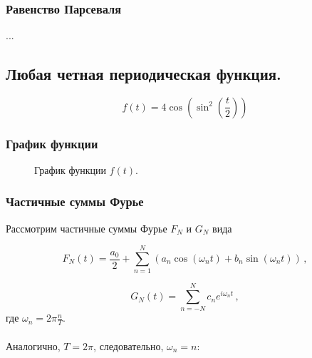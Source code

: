 \documentclass[a5paper, 10pt]{article}
\theoremstyle{definition}
\theoremstyle{plain}
\theoremstyle{remark}
\begin{document}
\newpage
\,
\newpage
\subsubsection{Равенство Парсеваля}

...







\newpage
\subsection{Любая четная периодическая функция.}
\begin{equation}
f(t) = 4 \cos \left( \sin^2 \left( \frac{t}{2}\right) \right)
\end{equation}

\subsubsection{График функции}
\begin{figure}[h]
\caption{График функции $f(t)$.}
\end{figure}

\subsubsection{Частичные суммы Фурье}
Рассмотрим частичные суммы Фурье $F_N$ и $G_N$ вида

\begin{equation}
F_N(t) = \frac{a_0}{2} + \sum  \limits_{n=1}^N \left( a_n \cos \left( \omega_n t \right) + b_n \sin \left( \omega_n t \right)  \right) \, ,
\end{equation}

\begin{equation}
G_N (t) = \sum  \limits_{n=-N}^N c_n e^{i \omega_n t} \, ,
\end{equation}
где $\omega_n = 2 \pi \frac{n}{T}$.\\
\\
Аналогично, $T = 2 \pi$, следовательно, $\omega_n = n$:
\end{document}
